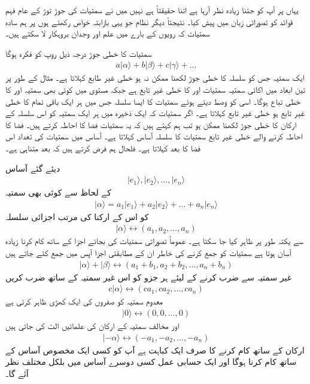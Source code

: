 یہاں پر آپ کو جتنا زیادہ نظر آرہا ہے اتنا حقیقتاً ہے نہیں میں نے سمتیات کی جوڑ توڑ کے عام فہم قوائد کو تصوراتی زبان میں پیش کیا۔ نتیجتاً دیگر نظام جو یہی بازابتہ خواص رکھتے ہوں پر ہم سادہ سمتیات کہ رویوں کے بارے میں علم اور وجدان بروہکار لا سکتے ہیں۔

سمتیات  کا خطی جوڑ درجہ ذیل روپ کو فکرہ ہوگا
\begin{align}
	a|\alpha\rangle+b|\beta\rangle+c|\gamma\rangle+\dots
\end{align}
ایک سمتیہ  جس کو  سلسلہ کا خطی جوڑ لکھنا ممکن نہ ہو خطی غیر طابع کہلاتا ہے۔ مثال کے طور پر تین ابعاد میں اکائی سمتیہ  سمتیات  اور  کا خطی غیر تابع ہے جبکہ  مستوی میں کوئی بھی سمتیہ  اور  کا خطی تباع ہوگا۔ اسی کو وصط دیتے ہوئے سمتیات کا ایسا سلسلہ جس میں ہر ایک باقی تمام کا خطی غیر تابع ہو خطی غیر تابع کہلاتا ہے۔ اگر سمتیات کہ ایک ذخیرہ میں ہر ایک سمتیہ کو اس سلسلہ کے ارکان کا خطی جوڑ لکھنا ممکن ہو تب ہم کہتے ہیں کہ یہ سمتیات فضا کا احاطہ کرتے ہیں۔ فضا کا احاطہ کرنے والے خطی غیر تابع سمتیات کا سلسلہ آساس کہلاتا ہے۔ آساس میں سمتیات کی تعداد اس فضا کا بعد کہلاتا ہے۔ فلحال ہم فرض کرتے ہیں کہ بعد  متناہی ہے۔

دیئے گئے آساس 
\begin{align}
	|e_1\rangle, |e_2\rangle, \dots, |e_n\rangle
\end{align}
کے لحاظ سے کوئی بھی سمتیہ
\begin{align}
	|\alpha\rangle=a_1|e_1\rangle+a_2|e_2\rangle+\dots+a_n|e_n\rangle
\end{align}
کو اس کے ارکنا کی مرتب  اجزائی سلسلہ 
\begin{align}
	|\alpha\rangle\leftrightarrow(a_1, a_2, \dots, a_n)
\end{align}
سے یکتہ طور پر ظاہر کیا جا سکتا ہے۔ عموماً تصوراتی سمتیات کی بجائے اجزا کے ساتھ کام کرنا زیادہ آسان ہوتا ہے سمتیات کو جمع کرنے کی خاطر ان کے مطابقتی اجزا آپس میں جمع کئے جاتے ہیں
\begin{align}
	|\alpha\rangle+|\beta\rangle\leftrightarrow(a_1+b_1, a_2+b_2, \dots, a_n+b_n)
\end{align}
غیر سمتیہ سے ضرب کرنے کے لیئے ہر جزو کو اس غیر سمتیہ کے ساتھ ضرب کریں
\begin{align}
	c|\alpha\rangle\leftrightarrow(ca_1, ca_2, \dots, ca_n)
\end{align}
معدوم سمتیہ کو صفروں کی ایک کھڑی ظاہر کرتی ہے
\begin{align}
	|0\rangle\leftrightarrow(0, 0, \dots, 0)
\end{align}
اور مخالف سمتیہ کے ارکان کی علماتیں الٹ کی جاتی ہیں
\begin{align}
	|-\alpha\rangle\leftrightarrow(-a_1, -a_2, \dots, -a_n)
\end{align}
ارکان کے ساتھ کام کرنے کا صرف ایک کباہت ہے آپ کو کسی ایک مخصوص آساس کے ساتھ کام کرنا ہوگا اور ایک حسابی عمل کسی دوسرے آساس میں بلکل مختلف نظر آئے گا۔

